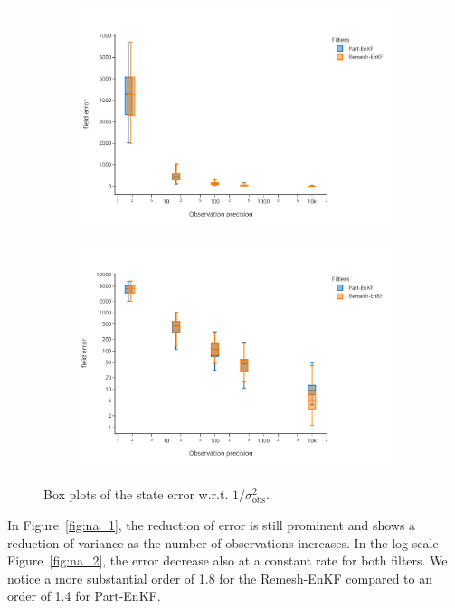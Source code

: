 \begin{figure}[h!]
	\centering
	\begin{subfigure}{0.49\linewidth}
		\centering
		\includegraphics[width=\linewidth]{./images/app2d/final/MSE_obs_precision_box.pdf}
		\caption{}
		\label{fig:obs_precision_1}
	\end{subfigure}
	\begin{subfigure}{0.49\linewidth}
		\centering
		\includegraphics[width=\linewidth]{./images/app2d/final/MSE_obs_precision_box_log.pdf}
		\caption{}
		\label{fig:obs_precision_2}
	\end{subfigure}
	\caption{Box plots of the state error w.r.t. $1/\sigma_{\text{obs}}^2$.}
\end{figure}


In Figure~\ref{fig:na_1}, the reduction of error is still prominent and shows a reduction of variance as the number of observations increases. In the log-scale Figure~\ref{fig:na_2}, the error decrease also at a constant rate for both filters. We notice a more substantial order of 1.8 for the Remesh-EnKF compared to an order of 1.4 for Part-EnKF.

